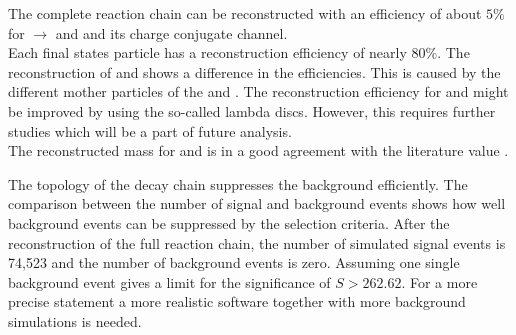 The complete reaction chain can be reconstructed with an efficiency of about $5\%$ for \pbarp $\rightarrow$ \excitedcascade and \anticascade and its
charge conjugate channel.\\
Each final states particle has a reconstruction efficiency of nearly $80\%$.
The reconstruction of \lam and \alam shows a difference in the efficiencies.
This is caused by the different mother particles of the \lam and \alam. 
The reconstruction efficiency for \lam and \alam might be improved by using the so-called lambda discs.
However, this requires further studies which will be a part of future analysis.\\
The reconstructed mass for \excitedcascade and \excitedanticascade is in a good agreement with the literature value \cite{PDG}.

The topology of the decay chain suppresses the background efficiently.
The comparison between the number of signal and background events shows how well background events can be suppressed by the selection criteria.
After the reconstruction of the full reaction chain, the number of simulated signal events is 74,523 and the number of background events is zero. 
Assuming one single background event gives a limit for the significance of $S>262.62$.
For a more precise statement a more realistic software together with more background simulations is needed. 

 
  


